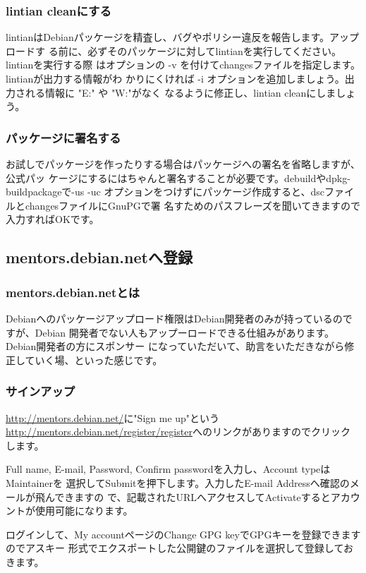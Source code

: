 \documentclass[mingoth,a4paper]{jsarticle}
\begin{document}
\subsubsection{lintian cleanにする}
lintianはDebianパッケージを精査し、バグやポリシー違反を報告します。アップロードす
る前に、必ずそのパッケージに対してlintianを実行してください。lintianを実行する際
はオプションの -v を付けてchangesファイルを指定します。lintianが出力する情報がわ
かりにくければ -i オプションを追加しましょう。出力される情報に "E:" や "W:"がなく
なるように修正し、lintian cleanにしましょう。

\subsubsection{パッケージに署名する}
お試しでパッケージを作ったりする場合はパッケージへの署名を省略しますが、公式パッ
ケージにするにはちゃんと署名することが必要です。debuildやdpkg-buildpackageで-us -uc
オプションをつけずにパッケージ作成すると、dscファイルとchangesファイルにGnuPGで署
名すためのパスフレーズを聞いてきますので入力すればOKです。

\subsection{mentors.debian.netへ登録}
\subsubsection{mentors.debian.netとは}
Debianへのパッケージアップロード権限はDebian開発者のみが持っているのですが、Debian
開発者でない人もアップーロードできる仕組みがあります。Debian開発者の方にスポンサー
になっていただいて、助言をいただきながら修正していく場、といった感じです。

\subsubsection{サインアップ}
\url{http://mentors.debian.net/}に"Sign me up"という
\url{http://mentors.debian.net/register/register}へのリンクがありますのでクリック
します。

Full name, E-mail, Password, Confirm passwordを入力し、Account typeはMaintainerを
選択してSubmitを押下します。入力したE-mail Addressへ確認のメールが飛んできますの
で、記載されたURLへアクセスしてActivateするとアカウントが使用可能になります。

ログインして、My accountページのChange GPG keyでGPGキーを登録できますのでアスキー
形式でエクスポートした公開鍵のファイルを選択して登録しておきます。
\end{document}
